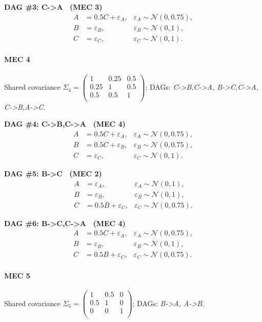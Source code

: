 \documentclass[11pt]{article}
\begin{document}
\noindent\textbf{DAG \#3: C->A \ (MEC 3)}
\begin{align*}
A &= 0.5 C + \varepsilon_A, & \varepsilon_A \sim \mathcal{N}(0, 0.75),\\B &= \varepsilon_B, & \varepsilon_B \sim \mathcal{N}(0, 1),\\C &= \varepsilon_C, & \varepsilon_C \sim \mathcal{N}(0, 1).
\end{align*}

\paragraph{MEC 4} Shared covariance \(\Sigma_4=\begin{pmatrix}1 & 0.25 & 0.5 \\0.25 & 1 & 0.5 \\0.5 & 0.5 & 1 \\\end{pmatrix}\); DAGs: \emph{C->B,C->A, B->C,C->A, C->B,A->C}.

\noindent\textbf{DAG \#4: C->B,C->A \ (MEC 4)}
\begin{align*}
A &= 0.5 C + \varepsilon_A, & \varepsilon_A \sim \mathcal{N}(0, 0.75),\\B &= 0.5 C + \varepsilon_B, & \varepsilon_B \sim \mathcal{N}(0, 0.75),\\C &= \varepsilon_C, & \varepsilon_C \sim \mathcal{N}(0, 1).
\end{align*}

\noindent\textbf{DAG \#5: B->C \ (MEC 2)}
\begin{align*}
A &= \varepsilon_A, & \varepsilon_A \sim \mathcal{N}(0, 1),\\B &= \varepsilon_B, & \varepsilon_B \sim \mathcal{N}(0, 1),\\C &= 0.5 B + \varepsilon_C, & \varepsilon_C \sim \mathcal{N}(0, 0.75).
\end{align*}

\noindent\textbf{DAG \#6: B->C,C->A \ (MEC 4)}
\begin{align*}
A &= 0.5 C + \varepsilon_A, & \varepsilon_A \sim \mathcal{N}(0, 0.75),\\B &= \varepsilon_B, & \varepsilon_B \sim \mathcal{N}(0, 1),\\C &= 0.5 B + \varepsilon_C, & \varepsilon_C \sim \mathcal{N}(0, 0.75).
\end{align*}

\paragraph{MEC 5} Shared covariance \(\Sigma_5=\begin{pmatrix}1 & 0.5 & 0 \\0.5 & 1 & 0 \\0 & 0 & 1 \\\end{pmatrix}\); DAGs: \emph{B->A, A->B}.
\end{document}

